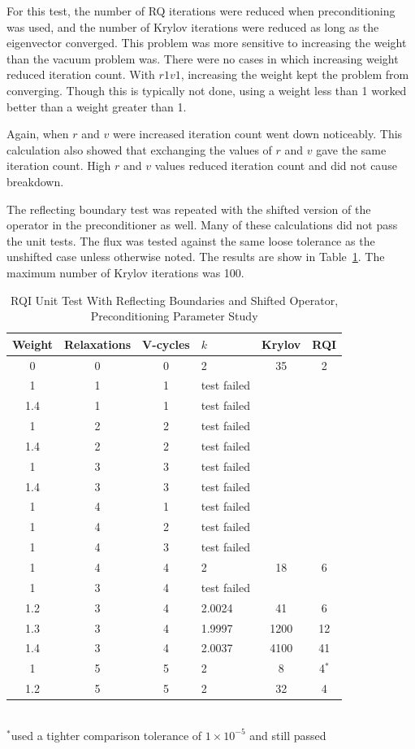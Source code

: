 For this test, the number of RQ iterations were reduced when preconditioning was used, and the number of  Krylov iterations were reduced as long as the eigenvector converged. This problem was more sensitive to increasing the weight than the vacuum problem was. There were no cases in which increasing weight reduced iteration count. With $r1v1$, increasing the weight kept the problem from converging. Though this is typically not done, using a weight less than 1 worked better than a weight greater than 1. 

Again, when $r$ and $v$ were increased iteration count went down noticeably. This calculation also showed that exchanging the values of $r$ and $v$ gave the same iteration count. High $r$ and $v$ values reduced iteration count and did not cause breakdown. 

The reflecting boundary test was repeated with the shifted version of the operator in the preconditioner as well. Many of these calculations did not pass the unit tests. The flux was tested against the same loose tolerance as the unshifted case unless otherwise noted. The results are show in Table~\ref{table:RQIUnitTestReflShifted}. The maximum number of Krylov iterations was 100.
%
\begin{table}[!h]
\caption{RQI Unit Test With Reflecting Boundaries and Shifted Operator, Preconditioning Parameter Study}
\begin{center}
\begin{tabular}{c c c l c c}
\hline
Weight & Relaxations & V-cycles & $k$ & Krylov & RQI \\[0.5ex]
\hline
0    & 0 & 0 & 2 & 35 & 2 \\
1    & 1 & 1 & test failed \\
1.4 & 1 & 1 & test failed \\
1    & 2 & 2 & test failed \\
1.4 & 2 & 2 & test failed \\
1    & 3 & 3 & test failed \\
1.4 & 3 & 3 & test failed \\
1    & 4 & 1 & test failed \\
1    & 4 & 2 & test failed \\
1    & 4 & 3 & test failed \\
1    & 4 & 4 & 2 & 18 & 6 \\ 
1    & 3 & 4 & test failed \\
1.2 & 3 & 4 & 2.0024 & 41 & 6 \\
1.3 & 3 & 4 & 1.9997 & 1200 & 12 \\
1.4 & 3 & 4 & 2.0037 & 4100 & 41 \\
1    & 5 & 5 & 2 & 8 & 4$^{*}$ \\
1.2 & 5 & 5 & 2& 32 & 4 \\
\hline 
\end{tabular}\\
$^{*}$used a tighter comparison tolerance of $1 \times 10^{-5}$ and still passed
\end{center}
\label{table:RQIUnitTestReflShifted}
\end{table}

